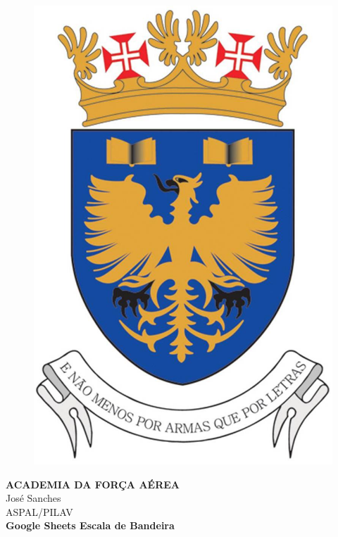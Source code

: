 \begin{titlepage}
    \begin{center}
    \begin{figure}
        \centering
        \includegraphics[width=.30\linewidth]{Imagens/img1_BrasAfa.jpg}
    \end{figure}
    {\fontsize{15}{48}\selectfont \bfseries ACADEMIA DA FORÇA AÉREA} 
    \\\vspace{20pt}
    {\Large José Sanches} \\
    {\Large ASPAL/PILAV} \\
    \vspace{15pt}
    {\Large\textbf{Google Sheets Escala de Bandeira}}
    \end{center}
    \vspace{15pt}
\end{titlepage}